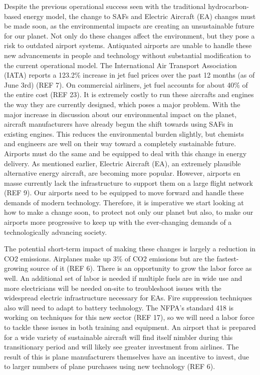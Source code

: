\documentclass{article}
\begin{document}
Despite the previous operational success seen with the traditional hydrocarbon-based energy model, the change to SAFs and Electric Aircraft (EA) changes must be made soon, as the environmental impacts are creating an unsustainable future for our planet. 
Not only do these changes affect the environment, but they pose a risk to outdated airport systems. 
Antiquated airports are unable to handle these new advancements in people and technology without substantial modification to the current operational model. 
The International Air Transport Association (IATA) reports a 123.2\% increase in jet fuel prices over the past 12 months (as of June 3rd) (REF 7). 
On commercial airliners, jet fuel accounts for about 40\% of the entire cost (REF 23).  
It is extremely costly to run these aircrafts and engines the way they are currently designed, which poses a major problem. 
With the major increase in discussion about our environmental impact on the planet, aircraft manufacturers have already begun the shift towards using SAFs in existing engines. 
This reduces the environmental burden slightly, but chemists and engineers are well on their way toward a completely sustainable future. 
Airports must do the same and be equipped to deal with this change in energy delivery. 
As mentioned earlier, Electric Aircraft (EA), an extremely plausible alternative energy aircraft, are becoming more popular. 
However, airports en masse currently lack the infrastructure to support them on a large flight network (REF 9). 
Our airports need to be equipped to move forward and handle these demands of modern technology. Therefore, it is imperative we start looking at how to make a change soon, to protect not only our planet but also, to make our airports more progressive to keep up with the ever-changing demands of a technologically advancing society.\par


The potential short-term impact of making these changes is largely a reduction in CO2 emissions. 
Airplanes make up 3\% of CO2 emissions but are the fastest-growing source of it (REF 6).  
There is an opportunity to grow the labor force as well. 
An additional set of labor is needed if multiple fuels are in wide use and more electricians will be needed on-site to troubleshoot issues with the widespread electric infrastructure necessary for EAs. 
Fire suppression techniques also will need to adapt to battery technology. 
The NFPA's standard 418 is working on techniques for this new sector (REF 17), so we will need a labor force to tackle these issues in both training and equipment. 
An airport that is prepared for a wide variety of sustainable aircraft will find itself nimbler during this transitionary period and will likely see greater investment from airlines. 
The result of this is plane manufacturers themselves have an incentive to invest, due to larger numbers of plane purchases using new technology (REF 6).\par 
\end{document}
